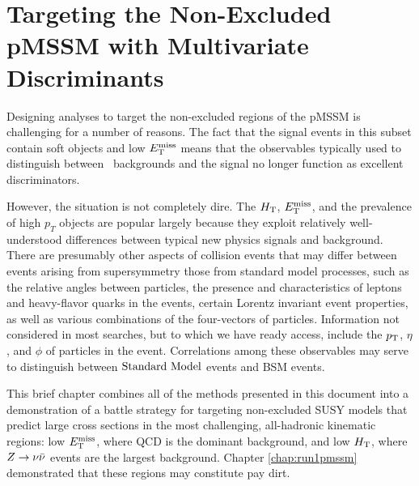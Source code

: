 \chapter{Targeting the Non-Excluded pMSSM with Multivariate Discriminants}
\label{chap:money}
\FloatBarrier

Designing analyses to target the non-excluded regions of the pMSSM is challenging for a number of reasons. The fact that the signal events in this subset contain soft objects and low $E_{\text{T}}^{\rm miss}$ means that the observables typically used to distinguish between \SM~backgrounds and the signal no longer function as excellent discriminators. 

However, the situation is not completely dire. The  $H_{\rm T}$, $E_{\text{T}}^{\rm miss}$, and the prevalence of high $p_{T}$ objects are popular largely because they exploit relatively well-understood differences between typical new physics signals and background. There are presumably other aspects of collision events that may differ between events arising from supersymmetry those from standard model processes, such as the relative angles between particles, the presence and characteristics of leptons and heavy-flavor quarks in the events, certain Lorentz invariant event properties, as well as various combinations of the four-vectors of particles. Information not considered in most searches, but to which we have ready access, include the $p_{\text{T}}$, $\eta$, and $\phi$ of particles in the event. Correlations among these observables may serve to distinguish between $\text{Standard\ Model}$ events and BSM events.

This brief chapter combines all of the methods presented in this document into a demonstration of a battle strategy for targeting non-excluded SUSY models that predict large cross sections in the most challenging, all-hadronic kinematic regions: low $E_{\text{T}}^{\rm miss}$, where QCD is the dominant background, and low $H_{\rm T}$, where $Z\rightarrow \nu\bar{\nu}$ events are the largest background. Chapter \ref{chap:run1pmssm} demonstrated that these regions may constitute pay dirt. 

